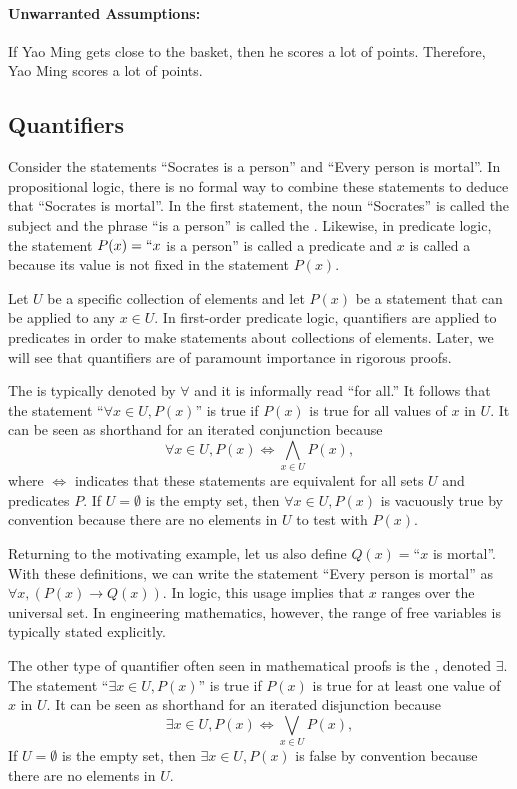 \paragraph{Unwarranted Assumptions:}
If Yao Ming gets close to the basket, then he scores a lot of points.
Therefore, Yao Ming scores a lot of points.


\subsection{Quantifiers}

Consider the statements ``Socrates is a person'' and ``Every person is mortal''.
In propositional logic, there is no formal way to combine these statements to deduce that ``Socrates is mortal''.
In the first statement, the noun ``Socrates'' is called the subject and the phrase ``is a person'' is called the .
Likewise, in predicate logic, the statement $P(x)=``x$ is a person'' is called a predicate and $x$ is called a  because its value is not fixed in the statement $P(x)$.

Let $U$ be a specific collection of elements and let $P(x)$ be a statement that can be applied to any $x\in U$.
In first-order predicate logic, quantifiers are applied to predicates in order to make statements about collections of elements.
Later, we will see that quantifiers are of paramount importance in rigorous proofs.

The  is typically denoted by $\forall$ and it is informally read ``for all.''
It follows that the statement ``$\forall x \in U, P(x)$'' is true if $P(x)$ is true for all values of $x$ in $U$.
It can be seen as shorthand for an iterated conjunction because
\[ \forall x \in U, P(x) \Leftrightarrow \bigwedge_{x\in U} P(x), \]
where $\Leftrightarrow$ indicates that these statements are equivalent for all sets $U$ and predicates $P$.
If $U=\emptyset$ is the empty set, then $\forall x \in U, P(x)$ is vacuously true by convention because there are no elements in $U$ to test with $P(x)$.

Returning to the motivating example, let us also define $Q(x)=$``$x$ is mortal''.
With these definitions, we can write the statement ``Every person is mortal'' as $\forall x, ( P(x) \to Q(x) )$.
In logic, this usage implies that $x$ ranges over the universal set.
In engineering mathematics, however, the range of free variables is typically stated explicitly.
 
The other type of quantifier often seen in mathematical proofs is the , denoted $\exists$.
The statement ``$\exists x \in U, P(x)$'' is true if $P(x)$ is true for at least one value of $x$ in $U$.
It can be seen as shorthand for an iterated disjunction because
\[ \exists x \in U, P(x) \Leftrightarrow \bigvee_{x\in U} P(x), \]
If $U=\emptyset$ is the empty set, then $\exists x \in U, P(x)$ is false by convention because there are no elements in $U$.

